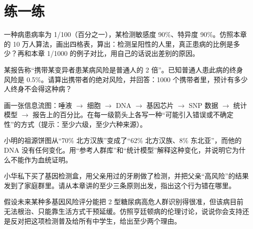 \section*{练一练}

\begin{sikaoti}
\item 一种病患病率为 1/100（百分之一），某检测敏感度 90\%、特异度 90\%。仿照本章的 10 万人算法，画出四格表，算出：检测呈阳性的人里，真正患病的比例是多少？再和本章 1/1000 的例子对比，用自己的话说出差别的原因。
\item 某报告称“携带某变异者患某病风险是普通人的 2 倍”。已知普通人患此病的终身风险是 0.5\%。请算出携带者的绝对风险，并回答：1000 个携带者里，预计有多少人终身不会得这种病？
\item 画一张信息流图：唾液 $\rightarrow$ 细胞 $\rightarrow$ DNA $\rightarrow$ 基因芯片 $\rightarrow$ SNP 数据 $\rightarrow$ 统计模型 $\rightarrow$ 报告上的百分比。在每一级箭头上各写一种“可能引入错误或不确定性”的方式（提示：至少六级，至少六种来源）。
\item 小明的祖源饼图从“70\% 北方汉族”变成了“62\% 北方汉族、8\% 东北亚”，而他的 DNA 没有任何变化。用“参考人群库”和“统计模型”解释这种变化，并说明它为什么不能作为血统证明。
\item 小华私下买了基因检测盒，用父亲用过的牙刷做了检测，并把父亲“高风险”的结果发到了家庭群里。请从本章讲的至少三条原则出发，指出这个行为错在哪里。
\item 假设未来某种多基因风险评分能把 2 型糖尿病高危人群识别得很准，但该病目前无法根治、只能靠生活方式干预延缓。仿照亨廷顿病的伦理讨论，说说你会支持还是反对把这项检测普及给所有中学生，给出至少两个理由。
\end{sikaoti}
